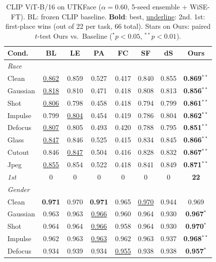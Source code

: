 \begin{table}[htbp]
\caption{CLIP ViT-B/16 on UTKFace ($\alpha{=}0.60$, 5-seed ensemble + WiSE-FT). BL: frozen CLIP baseline. \textbf{Bold}: best, \underline{underline}: 2nd. 1st: first-place wins (out of 22 per task, 66 total). Stars on Ours: paired $t$-test Ours vs.\ Baseline ($^{*}\!p{<}0.05$, $^{**}\!p{<}0.01$).}
\label{tab:app_clip_utk}
\centering
\scriptsize
\setlength{\tabcolsep}{3pt}
\renewcommand{\arraystretch}{0.9}
\begin{tabular}{lccccccc}
\toprule
Cond. & BL & LE & PA & FC & SF & dS & \textbf{Ours} \\
\midrule
\multicolumn{8}{l}{\textit{Race}} \\
Clean      & \underline{0.862} & 0.859 & 0.527 & 0.417 & 0.840 & 0.855 & \textbf{0.869}$^{**}$ \\
Gaussian   & \underline{0.818} & 0.810 & 0.471 & 0.418 & 0.808 & 0.813 & \textbf{0.856}$^{**}$ \\
Shot       & \underline{0.806} & 0.798 & 0.458 & 0.418 & 0.794 & 0.799 & \textbf{0.861}$^{**}$ \\
Impulse    & 0.799 & \underline{0.804} & 0.454 & 0.419 & 0.786 & 0.804 & \textbf{0.862}$^{**}$ \\
Defocus    & \underline{0.807} & 0.805 & 0.493 & 0.420 & 0.788 & 0.795 & \textbf{0.851}$^{**}$ \\
Glass      & \underline{0.847} & 0.846 & 0.525 & 0.415 & 0.834 & 0.845 & \textbf{0.866}$^{**}$ \\
Cutout     & 0.846 & \underline{0.847} & 0.504 & 0.416 & 0.828 & 0.832 & \textbf{0.867}$^{**}$ \\
Jpeg       & \underline{0.855} & 0.854 & 0.522 & 0.418 & 0.841 & 0.849 & \textbf{0.871}$^{**}$ \\
\textit{1st} & 0 & 0 & 0 & 0 & 0 & 0 & \textbf{22} \\
\midrule
\multicolumn{8}{l}{\textit{Gender}} \\
Clean      & \textbf{0.971} & 0.970 & \textbf{0.971} & 0.965 & \underline{0.970} & 0.944 & 0.969 \\
Gaussian   & 0.963 & 0.963 & \underline{0.966} & 0.960 & 0.964 & 0.930 & \textbf{0.967}$^{*}$ \\
Shot       & 0.964 & 0.964 & \underline{0.966} & 0.958 & 0.964 & 0.930 & \textbf{0.970}$^{*}$ \\
Impulse    & 0.962 & 0.963 & \underline{0.963} & 0.962 & 0.963 & 0.937 & \textbf{0.968}$^{**}$ \\
Defocus    & 0.934 & 0.939 & 0.934 & \underline{0.955} & 0.938 & 0.938 & \textbf{0.957}$^{*}$ \\

\end{tabular}
\end{table}
